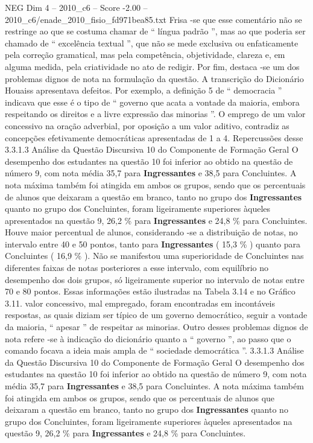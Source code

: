 \begin{textsample}{NEG Dim 4 – 2010\_c6 – Score -2.00 – 2010\_c6/enade\_2010\_fisio\_fd971bea85.txt}
Frisa -se que esse comentário não se restringe ao que se costuma chamar de “ língua padrão ”, mas ao que poderia ser chamado de “ excelência textual ”, que não se mede exclusiva ou enfaticamente pela correção gramatical, mas pela competência, objetividade, clareza e, em alguma medida, pela criatividade no ato de redigir.
Por fim, destaca -se um dos problemas dignos de nota na formulação da questão.
A transcrição do Dicionário Houaiss apresentava defeitos.
Por exemplo, a definição 5 de “ democracia ” indicava que esse é o tipo de “ governo que acata a vontade da maioria, embora respeitando os direitos e a livre expressão das minorias ”.
O emprego de um valor concessivo na oração adverbial, por oposição a um valor aditivo, contradiz as concepções efetivamente democráticas apresentadas de 1 a 4.
Repercussões desse 3.3.1.3 Análise da Questão Discursiva 10 do Componente de Formação Geral O desempenho dos estudantes na questão 10 foi inferior ao obtido na questão de número 9, com nota média 35,7 para \textbf{Ingressantes} e 38,5 para Concluintes.
A nota máxima também foi atingida em ambos os grupos, sendo que os percentuais de alunos que deixaram a questão em branco, tanto no grupo dos \textbf{Ingressantes} quanto no grupo dos Concluintes, foram ligeiramente superiores àqueles apresentados na questão 9, 26,2 \% para \textbf{Ingressantes} e 24,8 \% para Concluintes.
Houve maior percentual de alunos, considerando -se a distribuição de notas, no intervalo entre 40 e 50 pontos, tanto para \textbf{Ingressantes} ( 15,3 \% ) quanto para Concluintes ( 16,9 \% ).
Não se manifestou uma superioridade de Concluintes nas diferentes faixas de notas posteriores a esse intervalo, com equilíbrio no desempenho dos dois grupos, só ligeiramente superior no intervalo de notas entre 70 e 80 pontos.
Essas informações estão ilustradas na Tabela 3.14 e no Gráfico 3.11. valor concessivo, mal empregado, foram encontradas em incontáveis respostas, as quais diziam ser típico de um governo democrático, seguir a vontade da maioria, “ apesar ” de respeitar as minorias.
Outro desses problemas dignos de nota refere -se à indicação do dicionário quanto a “ governo ”, ao passo que o comando focava a ideia mais ampla de “ sociedade democrática ”. 3.3.1.3 Análise da Questão Discursiva 10 do Componente de Formação Geral O desempenho dos estudantes na questão 10 foi inferior ao obtido na questão de número 9, com nota média 35,7 para \textbf{Ingressantes} e 38,5 para Concluintes.
A nota máxima também foi atingida em ambos os grupos, sendo que os percentuais de alunos que deixaram a questão em branco, tanto no grupo dos \textbf{Ingressantes} quanto no grupo dos Concluintes, foram ligeiramente superiores àqueles apresentados na questão 9, 26,2 \% para \textbf{Ingressantes} e 24,8 \% para Concluintes.

\end{textsample}
